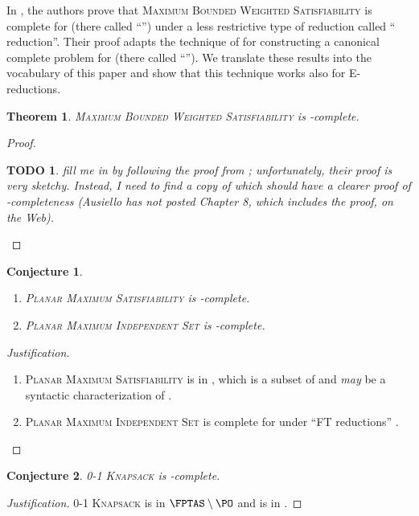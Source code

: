 \documentclass[]{article}
\theoremstyle{plain}
\newtheorem{conjecture}{Conjecture}
\newtheorem{theorem}{Theorem}
\newtheorem{todo}{TODO}
\theoremstyle{definition}
\newenvironment{justification}{\begin{proof}[Justification]}{\end{proof}}
\begin{document}
In \cite{sx95}, the authors prove that \textsc{Maximum Bounded Weighted Satisfiability} is complete for \ApxNCO{} (there called ``\NCX'') under a less restrictive type of reduction called ``\NCAS{} reduction''.
Their proof adapts the technique of \cite{cp91} for constructing a canonical complete problem for \ApxPO{} (there called ``\APX'').
We translate these results into the vocabulary of this paper and show that this technique works also for E-reductions.
\begin{theorem}
  \textsc{Maximum Bounded Weighted Satisfiability} is \ApxNCO-complete.
\end{theorem}
\begin{proof}
  \begin{todo}
    fill me in by following the proof from \cite{sx95}; unfortunately, their proof is very sketchy.
    Instead, I need to find a copy of \cite{acgkmp99} which should have a clearer proof of \ApxPO-completeness (Ausiello has not posted Chapter 8, which includes the proof, on the Web).
  \end{todo}
\end{proof}

\begin{conjecture}
  \mbox{}
  \begin{enumerate}
  \item \textsc{Planar Maximum Satisfiability} is \NCAS-complete.
  \item \textsc{Planar Maximum Independent Set} is \NCAS-complete.
  \end{enumerate}
\end{conjecture}
\begin{justification}
  \mbox{}
  \begin{enumerate}
  \item \textsc{Planar Maximum Satisfiability} is in \PMPSAT, which is a subset of \PTAS{} and \emph{may} be a syntactic characterization of \PTAS{} \cite{km96}.
  \item \textsc{Planar Maximum Independent Set} is complete for \PTAS{} under ``FT reductions'' \cite[Theorem~6]{bep06}.
  \end{enumerate}
\end{justification}

\begin{conjecture}
  \textsc{0-1 Knapsack} is \FNCAS-complete.
\end{conjecture}
\begin{justification}
  \textsc{0-1 Knapsack} is in $\FPTAS\setminus\PO$ \cite[Section~3.2]{ep10} and is in \FNCAS{} \cite[Theorem~2]{mayr88}.
\end{justification}
\end{document}
